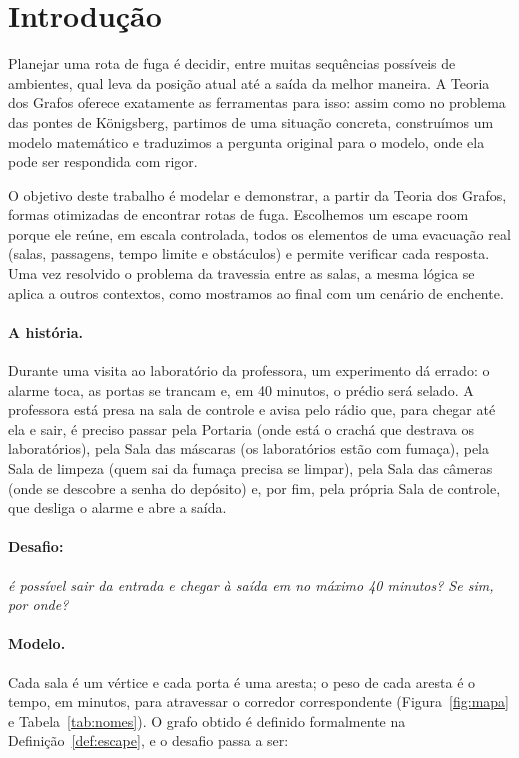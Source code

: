 \documentclass{article}
\theoremstyle{definition}
\theoremstyle{plain}
\begin{document}
\tableofcontents
\newpage

\section{Introdução}

Planejar uma rota de fuga é decidir, entre muitas sequências possíveis de
ambientes, qual leva da posição atual até a saída da melhor maneira. A Teoria dos
Grafos oferece exatamente as ferramentas para isso: assim como no problema das
pontes de Königsberg, partimos de uma situação concreta, construímos um modelo
matemático e traduzimos a pergunta original para o modelo, onde ela pode ser
respondida com rigor.

O objetivo deste trabalho é modelar e demonstrar, a partir da Teoria dos Grafos,
formas otimizadas de encontrar rotas de fuga. Escolhemos um escape room porque ele
reúne, em escala controlada, todos os elementos de uma evacuação real (salas,
passagens, tempo limite e obstáculos) e permite verificar cada resposta. Uma vez
resolvido o problema da travessia entre as salas, a mesma lógica se aplica a
outros contextos, como mostramos ao final com um cenário de enchente.

\paragraph{A história.} Durante uma visita ao laboratório da professora, um
experimento dá errado: o alarme toca, as portas se trancam e, em 40 minutos, o
prédio será selado. A professora está presa na sala de controle e avisa pelo
rádio que, para chegar até ela e sair, é preciso passar pela Portaria (onde está o
crachá que destrava os laboratórios), pela Sala das máscaras (os laboratórios
estão com fumaça), pela Sala de limpeza (quem sai da fumaça precisa se limpar),
pela Sala das câmeras (onde se descobre a senha do depósito) e, por fim, pela
própria Sala de controle, que desliga o alarme e abre a saída.

\paragraph{Desafio:} \emph{é possível sair da entrada e chegar à saída em no
máximo 40 minutos? Se sim, por onde?}

\paragraph{Modelo.} Cada sala é um vértice e cada porta é uma aresta; o peso de
cada aresta é o tempo, em minutos, para atravessar o corredor correspondente
(Figura~\ref{fig:mapa} e Tabela~\ref{tab:nomes}). O grafo obtido é definido
formalmente na Definição~\ref{def:escape}, e o desafio passa a ser:
\end{document}
